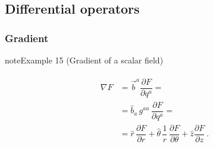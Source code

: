\documentclass[letterpaper,10pt,english]{jupyterBook}
\begin{document}
\subsection{Differential operators}
\label{\detokenize{ch/tensor-algebra-calculus/calculus-euclidean-cylindrical:differential-operators}}\label{\detokenize{ch/tensor-algebra-calculus/calculus-euclidean-cylindrical:tensor-calculus-cylindrical-differential-operators}}

\subsubsection{Gradient}
\label{\detokenize{ch/tensor-algebra-calculus/calculus-euclidean-cylindrical:gradient}}\label{\detokenize{ch/tensor-algebra-calculus/calculus-euclidean-cylindrical:tensor-calculus-cylindrical-differential-operators-gradient}}\label{ch/tensor-algebra-calculus/calculus-euclidean-cylindrical:example-0}
\begin{sphinxadmonition}{note}{Example 15 (Gradient of a scalar field)}


\begin{equation*}
\begin{split}\begin{aligned}
  \nabla F 
  & = \vec{b}^a \dfrac{\partial F}{\partial q^a} = \\
  & = \hat{b}_a \, g^{aa} \, \dfrac{\partial F}{\partial q^a} = \\
  & = \hat{r} \, \dfrac{\partial F}{\partial  r} 
    + \hat{\theta} \, \dfrac{1}{r} \, \dfrac{\partial F}{\partial \theta}  
    + \hat{z} \dfrac{\partial F}{\partial z} \ . 
\end{aligned}\end{split}
\end{equation*}\end{sphinxadmonition}
\label{ch/tensor-algebra-calculus/calculus-euclidean-cylindrical:example-1}
\end{document}
